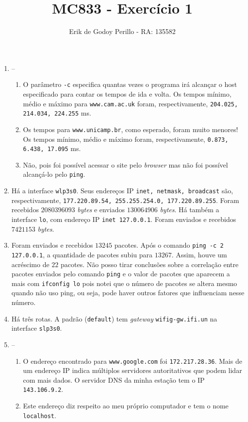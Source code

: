 \documentclass[11pt]{article}
\newcommand{\tit}[1]{\textit{#1}}
\newcommand{\ttt}[1]{\texttt{#1}}
\begin{document}
\title{MC833 - Exercício 1}
\author{Erik de Godoy Perillo - RA: 135582}
\maketitle

\begin{enumerate}
\item --
\begin{enumerate}
	\item O parâmetro \ttt{-c} especifica quantas vezes o programa irá alcançar 
		o host especificado para contar os tempos de ida e volta.
		Os tempos mínimo, médio e máximo para \ttt{www.cam.ac.uk} foram, 
		respectivamente, \ttt{204.025, 214.034, 224.255} ms.
	\item Os tempos para \ttt{www.unicamp.br}, como esperado, foram muito
		menores! Os tempos mínimo, médio e máximo foram, respectivamente,
		\ttt{0.873, 6.438, 17.095} ms. 
	\item Não, pois foi possível acessar o site pelo \tit{browser} mas não 
		foi possível alcançá-lo pelo \ttt{ping}.
\end{enumerate}

\item Há a interface \ttt{wlp3s0}.
	Seus endereços IP \ttt{inet, netmask, broadcast} são, respectivamente,
	\ttt{177.220.89.54, 255.255.254.0, 177.220.89.255}.
	Foram recebidos $2080396093$ \tit{bytes} e enviados $130064906$ 
	\tit{bytes}. Há também a interface \ttt{lo}, com endereço IP
	\ttt{inet 127.0.0.1}. Foram enviados e recebidos $7421153$ \tit{bytes}.

\item Foram enviados e recebidos $13245$ pacotes. Após o comando 
	\ttt{ping -c 2 127.0.0.1}, a quantidade de pacotes subiu para $13267$.
	Assim, houve um acréscimo de $22$ pacotes. Não posso tirar conclusões
	sobre a correlação entre pacotes enviados pelo comando \ttt{ping}
	e o valor de pacotes que aparecem a mais com \ttt{ifconfig lo} pois
	notei que o número de pacotes se altera mesmo quando não uso ping, ou
	seja, pode haver outros fatores que influenciam nesse número.

\item Há três rotas. A padrão (\ttt{default}) tem \tit{gateway} 
	\ttt{wifig-gw.ifi.un} na interface \ttt{slp3s0}.

\item --
\begin{enumerate}
	\item O endereço encontrado para \ttt{www.google.com} foi 
		\ttt{172.217.28.36}. Mais de um endereço IP indica múltiplos servidores
		autoritativos que podem lidar com mais dados. O servidor DNS da minha
		estação tem o IP \ttt{143.106.9.2}.
	\item Este endereço diz respeito ao meu próprio computador e tem o nome
		\ttt{localhost}.
\end{enumerate}


\end{enumerate}
\end{document}
